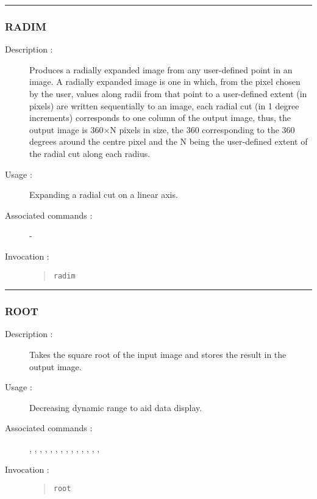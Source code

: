 \hrule
\subsubsection*{\label{RADIM}RADIM}

\begin{description}

\item[Description :] Produces a radially expanded image from any
user-defined point in an image.  A radially expanded image is one in
which, from the pixel chosen by the user, values along radii from that
point to a user-defined extent (in pixels) are written sequentially to
an image, each radial cut (in 1 degree increments) corresponds to one
column of the output image, thus, the output image is 360$\times$N
pixels in size, the 360 corresponding to the 360 degrees around the
centre pixel and the N being the user-defined extent of the radial cut
along each radius.

\item[Usage :] Expanding a radial cut on a linear axis.
\item[Associated commands :] -
\item[Invocation :]

\begin{quote}{\tt  radim }\end{quote}

\end{description}

\hrule
\subsubsection*{\label{ROOT}ROOT}

\begin{description}

\item[Description :] Takes the square root of the input image and
stores the result in the output image.

\item[Usage :] Decreasing dynamic range to aid data display.

\item[Associated commands :] {\tt {}},
{\tt {}}, {\tt {}},
{\tt {}}, {\tt {}},
{\tt {}}, {\tt {}},
{\tt {}}, {\tt {}},
{\tt {}}, {\tt {}},
{\tt {}}, {\tt {}},
{\tt {}}, {\tt {}}

\item[Invocation :]

\begin{quote}{\tt root }\end{quote}

\end{description}

